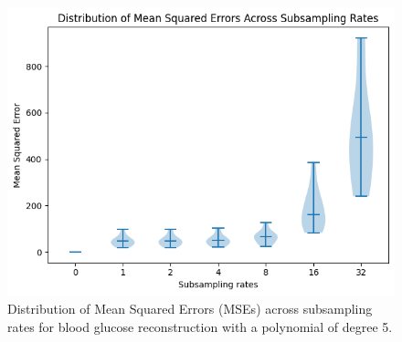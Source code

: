 \begin{figure}[h] %
	\centering
	\includegraphics[width=\linewidth]{Figures/distribution_mses_poly5.png} %
	\caption{Distribution of Mean Squared Errors (MSEs) across subsampling rates for blood glucose reconstruction with a polynomial of degree 5.}
	\label{fig:mses_poly5}  %
\end{figure}


